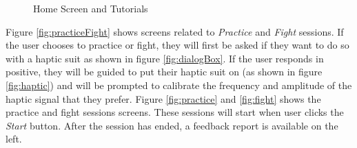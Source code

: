 \begin{figure}
{  }
  \quad 
  \caption{Home Screen and Tutorials} 
  \centering
  \label{fig:homeTut}
\end{figure}


Figure \ref{fig:practiceFight} shows screens related to \textit{Practice} and \textit{Fight} sessions. If the user chooses to practice or fight, they will first be asked if they want to do so with a haptic suit as shown in figure \ref{fig:dialogBox}. If the user responds in positive, they will be guided to put their haptic suit on (as shown in figure \ref{fig:haptic}) and will be prompted to calibrate the frequency and amplitude of the haptic signal that they prefer. Figure \ref{fig:practice} and \ref{fig:fight} shows the practice and fight sessions screens. These sessions will start when user clicks the \textit{Start} button. After the session has ended, a feedback report is available on the left.


